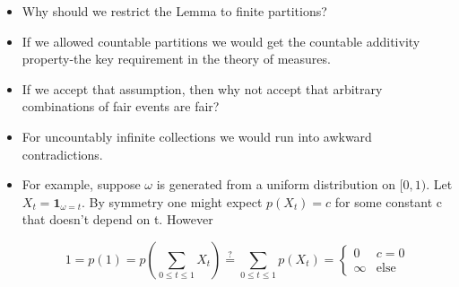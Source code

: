 \documentclass{beamer}
\begin{document}
\begin{frame}

\begin{itemize}
	\item Why should we restrict the Lemma to finite partitions?
	\pause
	\item  If we allowed countable partitions we would get the countable additivity property-the key requirement in the theory of measures.
		\pause
	\item  If we accept that assumption, then why not accept that arbitrary combinations of fair events are fair?
		\pause
	\item
	 For uncountably infinite collections we would run into awkward contradictions.
	 	\pause	 
	 \item  For example, suppose $\omega$ is generated from a uniform distribution on $[0, 1)$. Let $X_t = \mathbf{1}_{\omega = t}$.
	 	\pause
	  By symmetry one might expect $p(X_t) = c$ for
	 some constant c that doesn't depend on t.
	 \pause However
	 
	 $$1 = p(1) = p(\sum_{0\leq t \leq 1} X_t) \stackrel{?}{=} \sum_{0\leq t \leq 1} p(X_t) = \begin{cases}
	 0 & c = 0\\
	 \infty & \text{else}
	 \end{cases}$$
	 
\end{itemize}




\end{frame}
\end{document}
